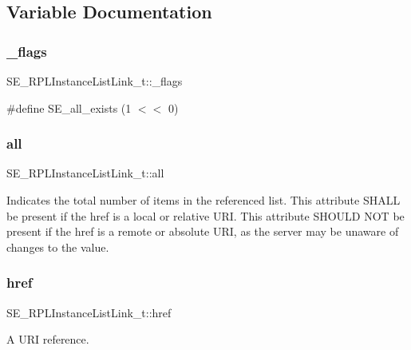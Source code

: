 \subsection{Variable Documentation}
\mbox{\label{group__RPLInstanceListLink_ga6d6d1023c9902e004cc289f39d2d1b6b}} 
\subsubsection{\texorpdfstring{\+\_\+flags}{\_flags}}
{\footnotesize\ttfamily S\+E\+\_\+\+R\+P\+L\+Instance\+List\+Link\+\_\+t\+::\+\_\+flags}

\#define S\+E\+\_\+all\+\_\+exists (1 $<$$<$ 0) \mbox{\label{group__RPLInstanceListLink_ga7001fa025c0862ff52e99fcd509fe6c0}} 
\subsubsection{\texorpdfstring{all}{all}}
{\footnotesize\ttfamily S\+E\+\_\+\+R\+P\+L\+Instance\+List\+Link\+\_\+t\+::all}

Indicates the total number of items in the referenced list. This attribute S\+H\+A\+LL be present if the href is a local or relative U\+RI. This attribute S\+H\+O\+U\+LD N\+OT be present if the href is a remote or absolute U\+RI, as the server may be unaware of changes to the value. \mbox{\label{group__RPLInstanceListLink_gaa34aa0bfadddbf5475945072be5facbf}} 
\subsubsection{\texorpdfstring{href}{href}}
{\footnotesize\ttfamily S\+E\+\_\+\+R\+P\+L\+Instance\+List\+Link\+\_\+t\+::href}

A U\+RI reference. 